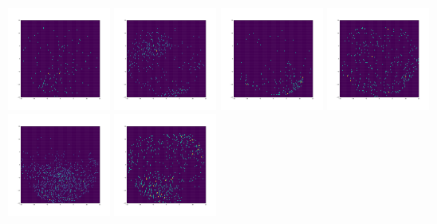 \documentclass[12pt,prd]{article}
\begin{document}
\begin{figure}[h!]
\includegraphics[width=0.24\textwidth]{../figures/stars_near_zero_2dhistgaiascan_l101_2_b58_4_ra212_7_dec55_2_npy_3.pdf}
\includegraphics[width=0.24\textwidth]{../figures/stars_near_zero_2dhistgaiascan_l101_2_b58_4_ra212_7_dec55_2_npy_4.pdf}
\includegraphics[width=0.24\textwidth]{../figures/stars_near_zero_2dhistgaiascan_l101_2_b58_4_ra212_7_dec55_2_npy_5.pdf}
\includegraphics[width=0.24\textwidth]{../figures/stars_near_zero_2dhistgaiascan_l101_2_b58_4_ra212_7_dec55_2_npy_6.pdf}
\includegraphics[width=0.24\textwidth]{../figures/stars_near_zero_2dhistgaiascan_l101_2_b58_4_ra212_7_dec55_2_npy_7.pdf}
\includegraphics[width=0.24\textwidth]{../figures/stars_near_zero_2dhistgaiascan_l101_2_b58_4_ra212_7_dec55_2_npy_8.pdf}

\end{figure}
\end{document}
